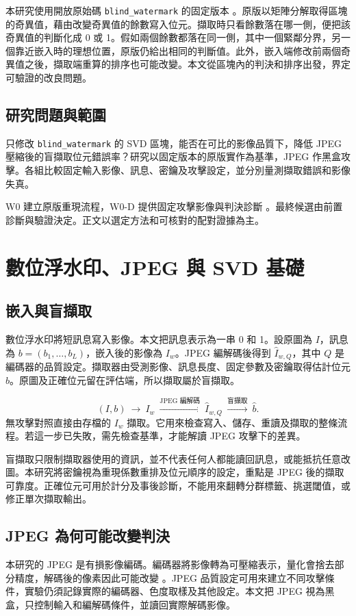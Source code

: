 \documentclass[12pt,a4paper,onecolumn]{article}
\begin{document}
本研究使用開放原始碼 \texttt{blind\_watermark} 的固定版本 \cite{core,interface}。原版以矩陣分解取得區塊的奇異值，藉由改變奇異值的餘數寫入位元。擷取時只看餘數落在哪一側，便把該奇異值的判斷化成 0 或 1。假如兩個餘數都落在同一側，其中一個緊鄰分界，另一個靠近嵌入時的理想位置，原版仍給出相同的判斷值。此外，嵌入端修改前兩個奇異值之後，擷取端重算的排序也可能改變。本文從區塊內的判決和排序出發，界定可驗證的改良問題。

\subsection{研究問題與範圍}
只修改 \texttt{blind\_watermark} 的 SVD 區塊，能否在可比的影像品質下，降低 JPEG 壓縮後的盲擷取位元錯誤率？研究以固定版本的原版實作為基準，JPEG 作黑盒攻擊。各組比較固定輸入影像、訊息、密鑰及攻擊設定，並分別量測擷取錯誤和影像失真。

W0 建立原版重現流程，W0-D 提供固定攻擊影像與判決診斷 \cite{w0,w0d}。最終候選由前置診斷與驗證決定。正文以選定方法和可核對的配對證據為主。

\section{數位浮水印、JPEG 與 SVD 基礎}

\subsection{嵌入與盲擷取}
數位浮水印將短訊息寫入影像。本文把訊息表示為一串 0 和 1。設原圖為 \(I\)，訊息為 \(b=(b_1,\ldots,b_L)\)，嵌入後的影像為 \(I_w\)。JPEG 編解碼後得到 \(\widehat I_{w,Q}\)，其中 \(Q\) 是編碼器的品質設定。擷取器由受測影像、訊息長度、固定參數及密鑰取得估計位元 \(\widehat b\)。原圖及正確位元留在評估端，所以擷取屬於盲擷取。

\[
 (I,b)\ \longrightarrow\ I_w
 \ \xrightarrow{\text{JPEG 編解碼}}\ \widehat I_{w,Q}
 \ \xrightarrow{\text{盲擷取}}\ \widehat b .
\]
無攻擊對照直接由存檔的 \(I_w\) 擷取。它用來檢查寫入、儲存、重讀及擷取的整條流程。若這一步已失敗，需先檢查基準，才能解讀 JPEG 攻擊下的差異。

盲擷取只限制擷取器使用的資訊，並不代表任何人都能讀回訊息，或能抵抗任意改圖。本研究將密鑰視為重現係數重排及位元順序的設定，重點是 JPEG 後的擷取可靠度。正確位元可用於計分及事後診斷，不能用來翻轉分群標籤、挑選閾值，或修正單次擷取輸出。

\subsection{JPEG 為何可能改變判決}
本研究的 JPEG 是有損影像編碼。編碼器將影像轉為可壓縮表示，量化會捨去部分精度，解碼後的像素因此可能改變 \cite{jpeg}。JPEG 品質設定可用來建立不同攻擊條件，實驗仍須記錄實際的編碼器、色度取樣及其他設定。本文把 JPEG 視為黑盒，只控制輸入和編解碼條件，並讀回實際解碼影像。
\end{document}

